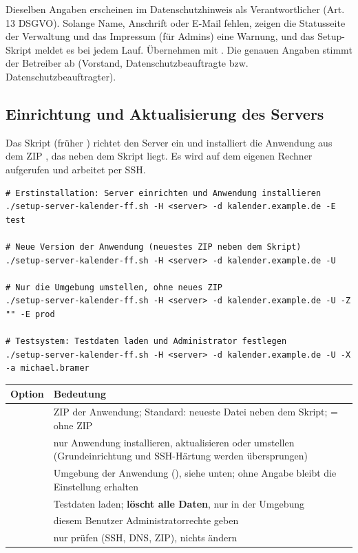 Dieselben Angaben erscheinen im Datenschutzhinweis als Verantwortlicher
(Art.\,13 DSGVO). Solange Name, Anschrift oder E-Mail fehlen, zeigen die
Statusseite der Verwaltung und das Impressum (für Admins) eine Warnung, und
das Setup-Skript meldet es bei jedem Lauf. Übernehmen mit .
Die genauen Angaben stimmt der Betreiber ab (Vorstand,
Datenschutzbeauftragte bzw. Datenschutzbeauftragter).

\subsection{Einrichtung und Aktualisierung des Servers}

Das Skript  (früher )
richtet den Server ein und installiert die Anwendung aus dem ZIP
, das neben dem Skript liegt. Es wird auf dem
eigenen Rechner aufgerufen und arbeitet per SSH.

\begin{lstlisting}
# Erstinstallation: Server einrichten und Anwendung installieren
./setup-server-kalender-ff.sh -H <server> -d kalender.example.de -E test

# Neue Version der Anwendung (neuestes ZIP neben dem Skript)
./setup-server-kalender-ff.sh -H <server> -d kalender.example.de -U

# Nur die Umgebung umstellen, ohne neues ZIP
./setup-server-kalender-ff.sh -H <server> -d kalender.example.de -U -Z "" -E prod

# Testsystem: Testdaten laden und Administrator festlegen
./setup-server-kalender-ff.sh -H <server> -d kalender.example.de -U -X -a michael.bramer
\end{lstlisting}

\begin{center}
\begin{tabularx}{\textwidth}{L{2.6cm}X}
\toprule
\textbf{Option} & \textbf{Bedeutung} \\
\midrule
{} & ZIP der Anwendung; Standard: neueste Datei
   neben dem Skript;  = ohne ZIP \\
 & nur Anwendung installieren, aktualisieren oder umstellen
  (Grundeinrichtung und SSH-Härtung werden übersprungen) \\
 & Umgebung der Anwendung (), siehe unten;
  ohne Angabe bleibt die Einstellung erhalten \\
 & Testdaten laden; \textbf{löscht alle Daten}, nur in der
  Umgebung  \\
 & diesem Benutzer Administratorrechte geben \\
 & nur prüfen (SSH, DNS, ZIP), nichts ändern \\
\bottomrule
\end{tabularx}
\end{center}


